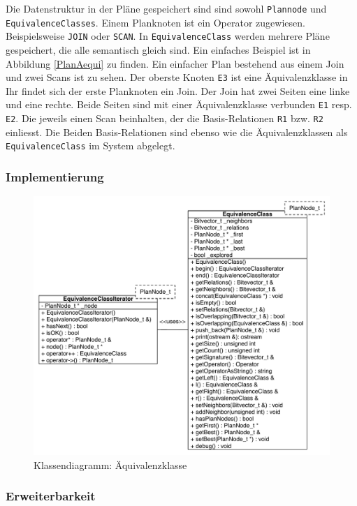 Die Datenstruktur in der Pläne gespeichert sind sind sowohl \texttt{Plannode} und \texttt{EquivalenceClasses}. Einem Planknoten ist ein Operator zugewiesen. Beispielsweise \texttt{JOIN} oder \texttt{SCAN}. In \texttt{EquivalenceClass} werden mehrere Pläne gespeichert, die alle semantisch gleich sind. Ein einfaches Beispiel ist in Abbildung \ref{PlanAequi} zu finden. Ein einfacher Plan bestehend aus einem Join und zwei Scans ist zu sehen. Der oberste Knoten \texttt{E3} ist eine Äquivalenzklasse in Ihr findet sich der erste Planknoten ein Join. Der Join hat zwei Seiten eine linke und eine rechte. Beide Seiten sind mit einer Äquivalenzklasse verbunden \texttt{E1} resp. \texttt{E2}. Die jeweils einen Scan beinhalten, der die Basis-Relationen \texttt{R1} bzw. \texttt{R2} einliesst. Die Beiden Basis-Relationen sind ebenso wie die Äquivalenzklassen als \texttt{EquivalenceClass} im System abgelegt.




\subsubsection{Implementierung}

\begin{figure}[ht]
  \centering
  \includegraphics[width=1\textwidth]{04_Implementierung/ClassEquivalenceClass.pdf}
  \caption{Klassendiagramm: Äquivalenzklasse}
  \label{ClassEquivalenceClass}
\end{figure}

\subsubsection{Erweiterbarkeit}

